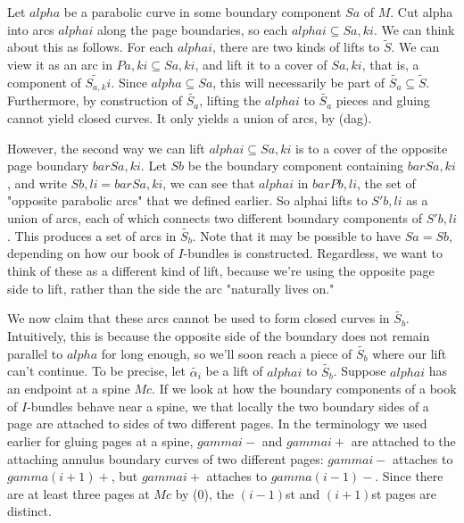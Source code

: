 \documentclass[12pt]{amsart}
\theoremstyle{definition}
\theoremstyle{remark}
\newcommand{\cin}{\subseteq}
\begin{document}
Let $alpha$ be a parabolic curve in some boundary component $Sa$ of $M$. Cut
alpha into arcs $alphai$ along the page boundaries, so each $alphai \cin Sa,ki$.
We can think about this as follows. For each $alphai$, there are two kinds of
lifts to $\widetilde{S}$. We can view it as an arc in $Pa,ki \cin Sa,ki$, and lift it
to a cover of $Sa,ki$, that is, a component of $\widetilde{S_{a,k}}i$. Since $alpha \cin
Sa$, this will necessarily be part of $\widetilde{S_a} \cin \widetilde{S}$. Furthermore, by
construction of $\widetilde{S_a}$, lifting the $alphai$ to $\widetilde{S_a}$ pieces and gluing
cannot yield closed curves.  It only yields a union of arcs, by (dag).

However, the second way we can lift $alphai \cin Sa,ki$ is to a cover of the
opposite page boundary $barSa,ki$. Let $Sb$ be the boundary component
containing $barSa,ki$, and write $Sb,li = barSa,ki$, we can see that $alphai$
in $barPb,li$, the set of "opposite parabolic arcs" that we defined earlier.
So alphai lifts to $S'b,li$ as a union of arcs, each of which connects two
different boundary components of $S'b,li$. This produces a set of arcs in
$\widetilde{S_b}$. Note that it may be possible to have $Sa = Sb$, depending on
how our book of $I$-bundles is constructed.  Regardless, we want to think of
these as a different kind of lift, because we're using the opposite page side
to lift, rather than the side the arc "naturally lives on."

We now claim that these arcs cannot be used to form closed curves in $\widetilde{S_b}$.
Intuitively, this is because the opposite side of the boundary does not remain
parallel to $alpha$ for long enough, so we'll soon reach a piece of $\widetilde{S_b}$
where our lift can't continue.  To be precise, let $\widetilde{\alpha_i}$ be a lift of
$alphai$ to $\widetilde{S_b}$.  Suppose $alphai$ has an endpoint at a spine $Mc$. If we
look at how the boundary components of a book of $I$-bundles behave near
a spine, we that locally the two boundary sides of a page are attached to sides
of two different pages.  In the terminology we used earlier for gluing pages at
a spine, $gammai-$ and $gammai+$ are attached to the attaching annulus boundary
curves of two different pages: $gammai-$ attaches to $gamma(i+1)+$, but
$gammai+$ attaches to $gamma(i-1)-$.  Since there are at least three pages at
$Mc$ by (0), the $(i-1)$st and $(i+1)$st pages are distinct.
\end{document}
